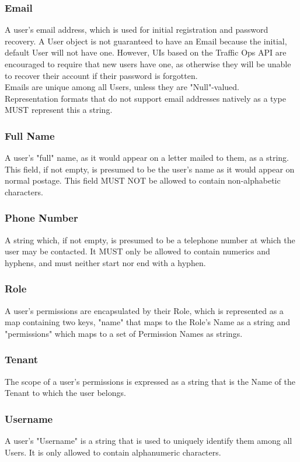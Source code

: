 \subsubsection{Email}
A user's email address, which is used for initial registration and password
recovery. A User object is not guaranteed to have an Email because the initial,
default User will not have one. However, UIs based on the Traffic Ops API are
encouraged to require that new users have one, as otherwise they will be unable
to recover their account if their password is forgotten.\\
Emails are unique among all Users, unless they are "Null"-valued.\\
Representation formats that do not support email addresses natively as a type
MUST represent this a string.

\subsubsection{Full Name}
A user's "full" name, as it would appear on a letter mailed to them, as a
string. This field, if not empty, is presumed to be the user's name as it would
appear on normal postage. This field MUST NOT be allowed to contain
non-alphabetic characters.

\subsubsection{Phone Number}
A string which, if not empty, is presumed to be a telephone number at which the
user may be contacted. It MUST only be allowed to contain numerics and hyphens,
and must neither start nor end with a hyphen.

\subsubsection{Role}
A user's permissions are encapsulated by their Role, which is represented as a
map containing two keys, "name" that maps to the Role's Name as a string and
"permissions" which maps to a set of Permission Names as strings.

\subsubsection{Tenant}
The scope of a user's permissions is expressed as a string that is the Name of
the Tenant to which the user belongs.

\subsubsection{Username}
A user's "Username" is a string that is used to uniquely identify them among all
Users. It is only allowed to contain alphanumeric characters.
